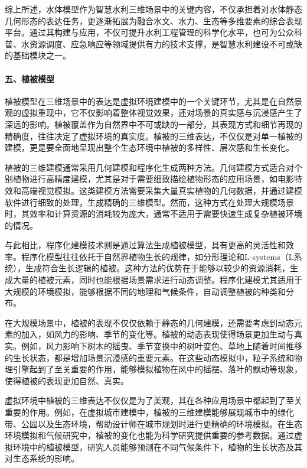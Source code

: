 综上所述，水体模型作为智慧水利三维场景中的关键内容，不仅承担着对水体静态几何形态的表达任务，更逐渐拓展为融合水文、水力、生态等多维要素的综合表现平台。通过其构建与应用，不仅可提升水利工程管理的科学化水平，也可为公众科普、水资源调度、应急响应等领域提供有力的技术支撑，是智慧水利建设不可或缺的基础模块之一。

\paragraph{五、植被模型}\label{ux4e94ux690dux88abux6a21ux578b}

植被模型在三维场景中的表达是虚拟环境建模中的一个关键环节，尤其是在自然景观的虚拟重现中，它不仅影响着整体视觉效果，还对场景的真实感与沉浸感产生了深远的影响。植被覆盖作为自然界中不可或缺的一部分，其表现方式和细节再现的精确度，往往决定了虚拟环境的真实度。植被的三维表达，不仅仅是对单一植被的建模，更是要全面地呈现出整个生态环境中植被的多样性、层次感和生长变化。

植被的三维建模通常采用几何建模和程序化生成两种方法。几何建模方式适合对个别植物进行高精度建模，尤其是对于需要细致描绘植物形态的应用场景，如电影特效和高端视觉模拟。这类建模方法需要采集大量真实植物的几何数据，并通过建模软件进行细致的处理，生成精确的三维模型。然而，这种方式在处理大规模场景时，其效率和计算资源的消耗较为庞大，通常不适用于需要快速生成复杂植被环境的情况。

与此相比，程序化建模技术则是通过算法生成植被模型，具有更高的灵活性和效率。程序化模型往往依托于自然界植物生长的规律，如分形理论和L-systems（L系统），生成符合生长逻辑的植被。这种方法的优势在于能够以较少的资源消耗，生成大量的植被元素，同时也能根据场景需求进行动态调整。程序化建模尤其适用于大规模的环境模拟，能够根据不同的地理和气候条件，自动调整植被的种类和分布。

在大规模场景中，植被的表现不仅仅依赖于静态的几何建模，还需要考虑到动态元素的加入，如风力的影响、季节的变化等。植被的动态表现使得场景更加生动与真实。例如，风力影响下树木的摇曳、季节变换中的树叶变色、草地上随着时间推移的生长状态，都是增加场景沉浸感的重要元素。在这些动态模拟中，粒子系统和物理引擎起到了至关重要的作用，能够模拟植物在风中的摇摆、落叶的飘动等现象，使得植被的表现更加自然、真实。

虚拟环境中植被的三维表达不仅仅是为了美观，其在各种应用场景中都起到了至关重要的作用。例如，在虚拟城市建模中，植被的三维建模能够展现城市中的绿化带、公园以及生态环境，帮助设计师在城市规划时进行更精确的环境模拟。在生态环境模拟和气候研究中，植被的变化也能为科学研究提供重要的参考数据。通过虚拟环境中的植被模型，研究人员能够预测在不同气候条件下，植物的生长状态及其对生态系统的影响。

